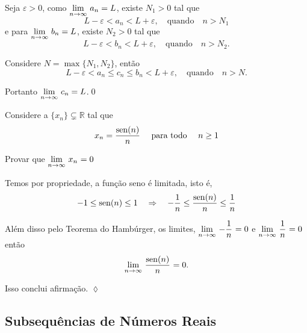 \prova Seja $\varepsilon>0$, como $\displaystyle{\lim_{n\to \infty}\,{a}_{n}}=L$, existe $N_1>0$ tal que
\begin{equation*}
  L-\varepsilon<a_n<L+\varepsilon,\quad\text{quando}\quad  n>N_1
\end{equation*}
 e para  $\displaystyle{\lim_{n\to \infty}\,{b}_{n}}=L$, existe $N_2>0$ tal que
\begin{equation*}
L-\varepsilon<b_n<L+\varepsilon, \quad\text{quando}\quad n>N_2.
\end{equation*}

Considere $N=\max\{N_1,N_2\}$, ent\~{a}o
\begin{equation*}
L-\varepsilon<a_n\leq c_n\leq b_n <L+\varepsilon, \quad\text{quando}\quad  n>N.
\end{equation*}

Portanto $\displaystyle{\lim_{n\to \infty}\,{c}_{n}}=L$.\qed

\begin{exer}
Considere a \seq $\{x_n\}\subsetneq \mathbb{R}$ tal que
\begin{equation*}
    x_n=\frac{\operatorname{sen}(n)}{n}\quad \text{ para todo }\quad  n\geq 1
\end{equation*}

Provar que $\displaystyle{\lim_{n\to \infty}\,{x_n}_{}}=0$
\end{exer}

\solo Temos por propriedade, a fun\c{c}\~{a}o seno \'{e} limitada, isto \'{e},
\begin{equation*}
 -1\leq \operatorname{sen}(n)\leq 1\quad \Rightarrow\quad  -\frac{1}{n}\leq \frac{\operatorname{sen}(n)}{n}\leq \frac{1}{n} 
\end{equation*}

Al\'{e}m disso pelo Teorema do Hamb\'{u}rger, os limites,
$\displaystyle{\lim_{n\to \infty}\,{-\frac{1}{n}}_{}}=0$ e $\displaystyle{\lim_{n\to \infty}\,{\frac{1}{n}}_{}}=0$ ent\~{a}o
\begin{equation*}
\displaystyle{\lim_{n\to \infty}\,{\frac{\operatorname{sen}(n)}{n}}_{}}=0.
\end{equation*}

Isso conclui afirma\c{c}\~{a}o. \hfill \(\lozenge\)

\subsection{Subsequ\^{e}ncias de N\'{u}meros Reais}

